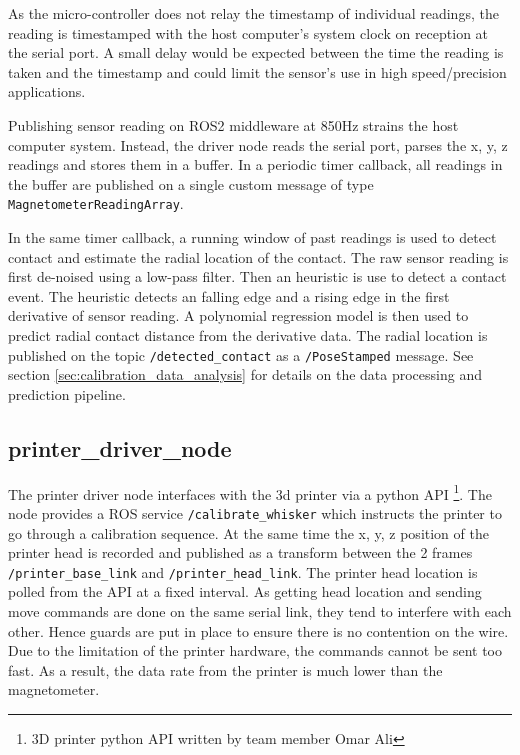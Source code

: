 \documentclass{report}
\begin{document}
As the micro-controller does not relay the timestamp of individual readings, the reading is timestamped with the host computer's system clock on reception at the serial port. A small delay would be expected between the time the reading is taken and the timestamp and could limit the sensor's use in high speed/precision applications.

Publishing sensor reading on ROS2 middleware at 850Hz strains the host computer system. Instead, the driver node reads the serial port, parses the x, y, z readings and stores them in a buffer. In a periodic timer callback, all readings in the buffer are published on a single custom message of type \verb|MagnetometerReadingArray|.

In the same timer callback, a running window of past readings is used to detect contact and estimate the radial location of the contact. The raw sensor reading is first de-noised using a low-pass filter. Then an heuristic is use to detect a contact event. The heuristic detects an falling edge and a rising edge in the first derivative of sensor reading. A polynomial regression model is then used to predict radial contact distance from the derivative data.
The radial location is published on the topic \verb|/detected_contact| as a \verb|/PoseStamped| message. See section \ref{sec:calibration_data_analysis} for details on the data processing and prediction pipeline.

\subsection{printer\_driver\_node}

The printer driver node interfaces with the 3d printer via a python API \footnote{3D printer python API written by team member Omar Ali}. The node provides a ROS service \verb|/calibrate_whisker| which instructs the printer to go through a calibration sequence. At the same time the x, y, z position of the printer head is recorded and published as a transform between the 2 frames \verb|/printer_base_link| and \verb|/printer_head_link|. The printer head location is polled from the API at a fixed interval. As getting head location and sending move commands are done on the same serial link, they tend to interfere with each other. Hence guards are put in place to ensure there is no contention on the wire. Due to the limitation of the printer hardware, the commands cannot be sent too fast. As a result, the data rate from the printer is much lower than the magnetometer.
\end{document}
